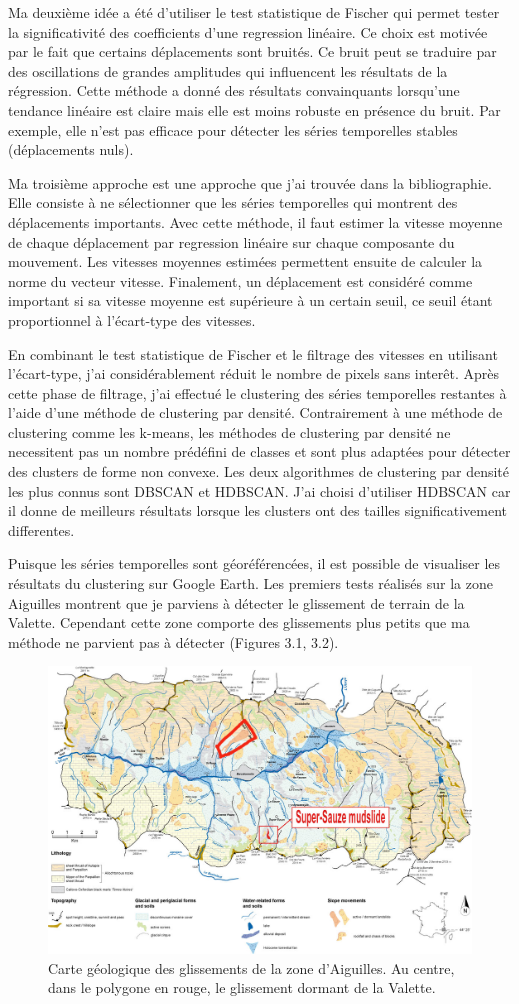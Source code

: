 \documentclass[11pt, openany]{report}
\begin{document}
Ma deuxième idée a été d'utiliser le test statistique de Fischer qui permet tester la significativité des coefficients d'une regression linéaire. Ce choix est motivée par le fait que certains déplacements sont bruités. Ce bruit peut se traduire par des oscillations de grandes amplitudes qui influencent les résultats de la régression. Cette méthode a donné des résultats convainquants lorsqu'une tendance linéaire est claire mais elle est moins robuste en présence du bruit. Par exemple, elle n'est pas efficace pour détecter les séries temporelles stables (déplacements nuls).

Ma troisième approche est une approche que j'ai trouvée dans la bibliographie. Elle consiste à ne sélectionner que les séries temporelles qui montrent des déplacements 
importants. Avec cette méthode, il faut estimer la vitesse moyenne de chaque déplacement par regression linéaire sur chaque composante du mouvement. Les vitesses moyennes estimées permettent ensuite de calculer la norme du vecteur vitesse. Finalement, un déplacement est considéré comme important si sa vitesse moyenne est supérieure à un certain seuil, ce  seuil étant proportionnel à l'écart-type des vitesses.

En combinant le test statistique de Fischer et le filtrage des vitesses en utilisant l'écart-type, j'ai considérablement réduit le nombre de pixels sans interêt. Après cette phase de filtrage, j'ai effectué le clustering des séries temporelles restantes à l'aide d'une méthode de clustering par densité. Contrairement à une méthode de clustering comme les k-means, les méthodes de clustering par densité ne necessitent pas un nombre prédéfini de classes et sont plus adaptées pour détecter des clusters de forme non convexe. Les deux algorithmes de clustering par densité les plus connus sont DBSCAN et HDBSCAN. J'ai choisi d'utiliser HDBSCAN car il donne de meilleurs résultats lorsque les clusters ont des tailles significativement differentes.

Puisque les séries temporelles sont géoréférencées, il est possible de visualiser les résultats du clustering sur Google Earth. Les premiers tests réalisés sur la zone Aiguilles montrent que je parviens à détecter le glissement de terrain de la Valette. Cependant cette zone comporte des glissements plus petits que ma méthode ne parvient pas à détecter (Figures 3.1, 3.2).

\begin{figure}[H]
  \centering
  \includegraphics[width=0.6\linewidth]{carte_lavalette.png}
  \caption{Carte géologique des glissements de la zone d'Aiguilles. Au centre, dans le polygone en rouge, le glissement dormant de la Valette.}
\end{figure}
\end{document}
